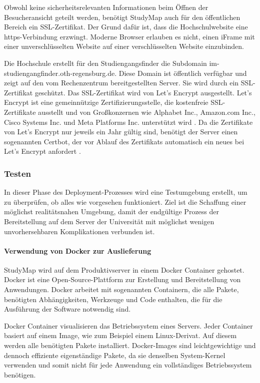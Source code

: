 Obwohl keine sicherheitsrelevanten Informationen beim Öffnen der Besucheransicht geteilt werden, benötigt StudyMap auch für den öffentlichen Bereich ein SSL-Zertifikat. Der Grund dafür ist, dass die Hochschulwebsite eine https-Verbindung erzwingt. Moderne Browser erlauben es nicht, einen iFrame mit einer unverschlüsselten Website auf einer verschlüsselten Website einzubinden. \parencite{vyas_mixed_2013}

Die Hochschule erstellt für den Studiengangsfinder die Subdomain im-studiengangfinder.oth-regensburg.de. Diese Domain ist öffentlich verfügbar und zeigt auf den vom Rechenzentrum bereitgestellten Server. Sie wird durch ein SSL-Zertifikat geschützt. Das SSL-Zertifikat wird von Let's Encrypt ausgestellt. Let's Encrypt ist eine gemeinnützige Zertifizierungsstelle, die kostenfreie SSL-Zertifikate ausstellt und von Großkonzernen wie Alphabet Inc., Amazon.com Inc., Cisco Systems Inc. und Meta Platforms Inc. unterstützt wird \parencite{internet_security_research_group_isrg_lets_nodate}. Da die Zertifikate von Let's Encrypt nur jeweils ein Jahr gültig sind, benötigt der Server einen sogenannten Certbot, der vor Ablauf des Zertifikats automatisch ein neues bei Let's Encrypt anfordert \parencite{electronic_frontier_foundation_certbot_nodate}.

\subsubsection{Testen}
In dieser Phase des Deployment-Prozesses wird eine Testumgebung erstellt, um zu überprüfen, ob alles wie vorgesehen funktioniert. Ziel ist die Schaffung einer möglichst realitätsnahen Umgebung, damit der endgültige Prozess der Bereitstellung auf dem Server der Universität mit möglichst wenigen unvorhersehbaren Komplikationen verbunden ist.

\paragraph*{Verwendung von Docker zur Auslieferung}
StudyMap wird auf dem Produktivserver in einem Docker Container gehostet. Docker ist eine Open-Source-Plattform zur Erstellung und Bereitstellung von Anwendungen. Docker arbeitet mit sogenannten Containern, die alle Pakete, benötigten Abhängigkeiten, Werkzeuge und Code enthalten, die für die Ausführung der Software notwendig sind. \parencite{amazon_web_services_inc_was_2023}

Docker Container visualisieren das Betriebssystem eines Servers. Jeder Container basiert auf einem Image, wie zum Beispiel einem Linux-Derivat. Auf diesem werden alle benötigten Pakete installiert. Docker-Images sind leichtgewichtige und dennoch effiziente eigenständige Pakete, da sie denselben System-Kernel verwenden und somit nicht für jede Anwendung ein vollständiges Betriebssystem benötigen. \parencite{docker_inc_what_2024}


